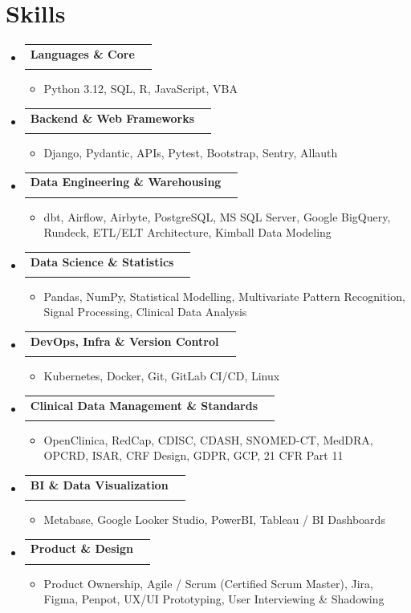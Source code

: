 \documentclass[letterpaper,11pt]{article}
\makeatletter
\newcommand{\resumeItem}[1]{
  \item\small{
    {#1 \vspace{-2pt}}
  }
}
\newcommand{\resumeSubheading}[4]{
  \vspace{-2pt}\item
    \begin{tabular*}{0.97\textwidth}[t]{l@{\extracolsep{\fill}}r}
      \textbf{#1} & #2 \\
      \textit{\small#3} & \textit{\small #4} \\
    \end{tabular*}\vspace{-7pt}
}
\newcommand{\resumeSubHeadingListStart}{\begin{itemize}[leftmargin=0.15in, label={}]}
\newcommand{\resumeSubHeadingListEnd}{\end{itemize}}
\newcommand{\resumeItemListStart}{\begin{itemize}}
\newcommand{\resumeItemListEnd}{\end{itemize}\vspace{-5pt}}
\makeatother
\begin{document}
\section{Skills}
\resumeSubHeadingListStart
    \resumeSubheading
     {Languages \& Core}{}{}
     {}{}
     \resumeItemListStart
     \vspace{-5mm}
     \resumeItem{Python 3.12, SQL, R, JavaScript, VBA}
       \resumeItemListEnd
    \resumeSubheading
     {Backend \& Web Frameworks}{}{}
     {}{}
     \resumeItemListStart
     \vspace{-5mm}
     \resumeItem{Django, Pydantic, APIs, Pytest, Bootstrap, Sentry, Allauth}
       \resumeItemListEnd
    \resumeSubheading
     {Data Engineering \& Warehousing}{}{}
     {}{}
     \resumeItemListStart
     \vspace{-5mm}
     \resumeItem{dbt, Airflow, Airbyte, PostgreSQL, MS SQL Server, Google BigQuery, Rundeck, ETL/ELT Architecture, Kimball Data Modeling}
       \resumeItemListEnd
    \resumeSubheading
     {Data Science \& Statistics}{}{}
     {}{}
     \resumeItemListStart
     \vspace{-5mm}
     \resumeItem{Pandas, NumPy, Statistical Modelling, Multivariate Pattern Recognition, Signal Processing, Clinical Data Analysis}
       \resumeItemListEnd
    \resumeSubheading
     {DevOps, Infra \& Version Control}{}{}
     {}{}
     \resumeItemListStart
     \vspace{-5mm}
     \resumeItem{Kubernetes, Docker, Git, GitLab CI/CD, Linux}
       \resumeItemListEnd
    \resumeSubheading
     {Clinical Data Management \& Standards}{}{}
     {}{}
     \resumeItemListStart
     \vspace{-5mm}
     \resumeItem{OpenClinica, RedCap, CDISC, CDASH, SNOMED-CT, MedDRA, OPCRD, ISAR, CRF Design, GDPR, GCP, 21 CFR Part 11}
       \resumeItemListEnd
    \resumeSubheading
     {BI \& Data Visualization}{}{}
     {}{}
     \resumeItemListStart
     \vspace{-5mm}
     \resumeItem{Metabase, Google Looker Studio, PowerBI, Tableau / BI Dashboards}
       \resumeItemListEnd
    \resumeSubheading
     {Product \& Design}{}{}
     {}{}
     \resumeItemListStart
     \vspace{-5mm}
     \resumeItem{Product Ownership, Agile / Scrum (Certified Scrum Master), Jira, Figma, Penpot, UX/UI Prototyping, User Interviewing \& Shadowing}
       \resumeItemListEnd
\resumeSubHeadingListEnd

\end{document}
